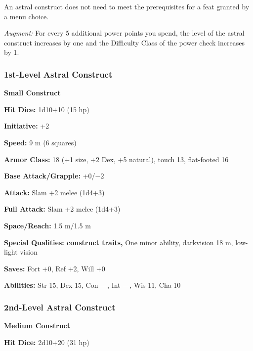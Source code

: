 {	%

	An astral construct does not need to meet the prerequisites for a feat granted by a menu choice.

	\textit{Augment:} For every 5 additional power points you spend, the level of the astral construct increases by one and the Difficulty Class of the power check increases by 1.


\subsubsection{1st-Level Astral Construct}
	\begin{MonsterMiniStats}
	\textbf{Small Construct}

	\textbf{Hit Dice:} 1d10+10 (15 hp)

	\textbf{Initiative:} +2

	\textbf{Speed:} 9 m (6 squares)

	\textbf{Armor Class:} 18 (+1 size, +2 Dex, +5 natural), touch 13, flat-footed 16

	\textbf{Base Attack/Grapple:} +0/$-2$

	\textbf{Attack:} Slam +2 melee (1d4+3)

	\textbf{Full Attack:} Slam +2 melee (1d4+3)

	\textbf{Space/Reach:} 1.5 m/1.5 m

	\textbf{Special Qualities: construct traits,} One minor ability, darkvision 18 m, low-light vision

	\textbf{Saves:} Fort +0, Ref +2, Will +0

	\textbf{Abilities:} Str 15, Dex 15, Con ---, Int ---, Wis 11, Cha 10
	\end{MonsterMiniStats}

\subsubsection{2nd-Level Astral Construct}
	\begin{MonsterMiniStats}
	\textbf{Medium Construct}

	\textbf{Hit Dice:} 2d10+20 (31 hp)


\end{MonsterMiniStats}}
